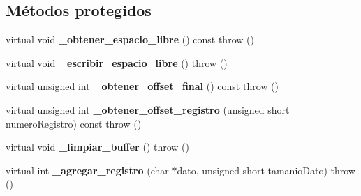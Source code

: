 \subsection*{\-Métodos protegidos}
\begin{DoxyCompactItemize}
\item 
\hypertarget{class_bloque_a7c4648cb0cff1831fca8f88c5690a6fc}{virtual void {\bfseries \-\_\-obtener\-\_\-espacio\-\_\-libre} () const   throw ()}\label{class_bloque_a7c4648cb0cff1831fca8f88c5690a6fc}

\item 
\hypertarget{class_bloque_a8a5c814e07af22dc4f5f591716f13af1}{virtual void {\bfseries \-\_\-escribir\-\_\-espacio\-\_\-libre} ()  throw ()}\label{class_bloque_a8a5c814e07af22dc4f5f591716f13af1}

\item 
\hypertarget{class_bloque_ae8e07d0e7e8246c60f295adaee955ec5}{virtual unsigned int {\bfseries \-\_\-obtener\-\_\-offset\-\_\-final} () const   throw ()}\label{class_bloque_ae8e07d0e7e8246c60f295adaee955ec5}

\item 
\hypertarget{class_bloque_a2f7e260c6c08e34139fbe196377f88bc}{virtual unsigned int {\bfseries \-\_\-obtener\-\_\-offset\-\_\-registro} (unsigned short numero\-Registro) const   throw ()}\label{class_bloque_a2f7e260c6c08e34139fbe196377f88bc}

\item 
\hypertarget{class_bloque_aab22ca2556a159f2c0cfebf005a04574}{virtual void {\bfseries \-\_\-limpiar\-\_\-buffer} ()  throw ()}\label{class_bloque_aab22ca2556a159f2c0cfebf005a04574}

\item 
\hypertarget{class_bloque_a5d3812f751f3ec25e51a7f3577a8f83b}{virtual int {\bfseries \-\_\-agregar\-\_\-registro} (char $\ast$dato, unsigned short tamanio\-Dato)  throw ()}\label{class_bloque_a5d3812f751f3ec25e51a7f3577a8f83b}

\end{DoxyCompactItemize}
